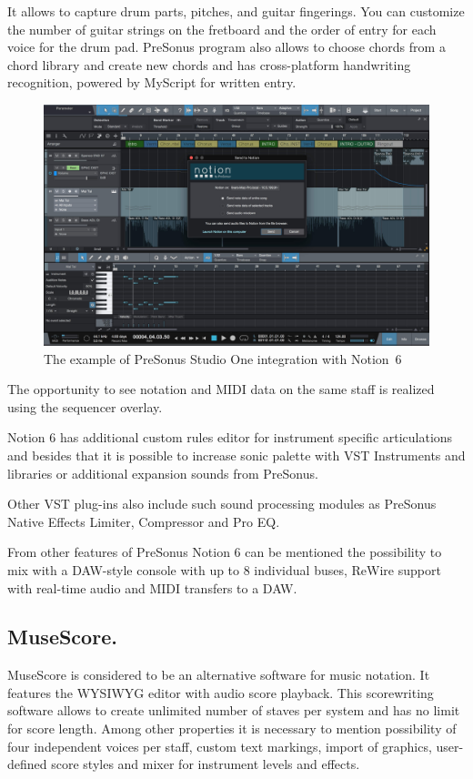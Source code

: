 \documentclass[thesis=B,english]{FITthesis}[2019/12/23]
\begin{document}
It allows to capture drum parts, pitches, and guitar fingerings. You can customize the number of guitar strings on the fretboard and the order of entry for each voice for the drum pad. PreSonus program also allows to choose chords from a chord library and create new chords and has cross-platform handwriting recognition, powered by MyScript for written entry.

\begin{figure}[ht]
            \includegraphics[width=\textwidth]{PreSonus-Studio-One-3.3.jpg}
            \caption[PreSonus Studio One integration with Notion 6]{The example of PreSonus Studio One integration with Notion~6~\cite{PreSonusNotion6}}
            \label{fig:PreSonus-Studio-One-3.3}
\end{figure}

The opportunity to see notation and MIDI data on the same staff is realized using the sequencer overlay.

Notion 6 has additional custom rules editor for instrument specific articulations and besides that it is possible to increase sonic palette with VST Instruments and libraries or additional expansion sounds from PreSonus. 

Other VST plug-ins also include such  sound processing modules as PreSonus Native Effects Limiter, Compressor and Pro EQ.

From other features of PreSonus Notion 6 can be mentioned the  possibility to mix with a DAW-style console with up to 8 individual buses, ReWire support with real-time audio and MIDI transfers to a DAW.

\subsection{MuseScore.}
MuseScore is considered to be an alternative software for music notation\cite{MuseScore}. It features the WYSIWYG editor with audio score playback. This scorewriting software allows to create unlimited number of staves per system and has no limit for score length. Among other properties it is necessary to mention possibility of four independent voices per staff, custom text markings, import of graphics, user-defined score styles and mixer for instrument levels and effects.
\end{document}
